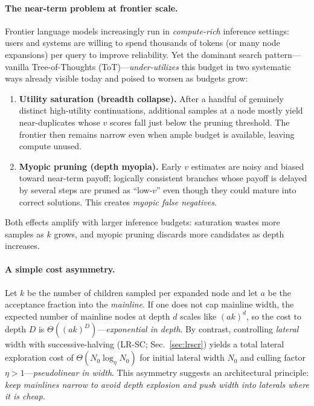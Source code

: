 \documentclass{article}
\begin{document}
\paragraph{The near-term problem at frontier scale.}
Frontier language models increasingly run in \emph{compute-rich} inference settings:
users and systems are willing to spend thousands of tokens (or many node expansions) per query to improve reliability.
Yet the dominant search pattern—vanilla Tree-of-Thoughts (ToT)—\emph{under-utilizes} this budget in two systematic ways already visible today and poised to worsen as budgets grow:
\begin{enumerate}[leftmargin=*, itemsep=2pt, topsep=2pt]
    \item \textbf{Utility saturation (breadth collapse).} After a handful of genuinely distinct high-utility continuations, additional samples at a node mostly yield near-duplicates whose $v$ scores fall just below the pruning threshold. The frontier then remains narrow even when ample budget is available, leaving compute unused.
    \item \textbf{Myopic pruning (depth myopia).} Early $v$ estimates are noisy and biased toward near-term payoff; logically consistent branches whose payoff is delayed by several steps are pruned as ``low-$v$'' even though they could mature into correct solutions. This creates \emph{myopic false negatives}.
\end{enumerate}
Both effects amplify with larger inference budgets: saturation wastes more samples as $k$ grows, and myopic pruning discards more candidates as depth increases.

\paragraph{A simple cost asymmetry.}
Let $k$ be the number of children sampled per expanded node and let $a$ be the acceptance fraction into the \emph{mainline}.
If one does not cap mainline width, the expected number of mainline nodes at depth $d$ scales like $(ak)^d$, so the cost to depth $D$ is $\Theta((ak)^D)$—\emph{exponential in depth}.
By contrast, controlling \emph{lateral} width with successive-halving (LR-SC; Sec.~\ref{sec:lrscr}) yields a total lateral exploration cost of $\Theta(N_0 \log_{\eta} N_0)$ for initial lateral width $N_0$ and culling factor $\eta>1$—\emph{pseudolinear in width}.
This asymmetry suggests an architectural principle:
\emph{keep mainlines narrow to avoid depth explosion and push width into laterals where it is cheap.}
\end{document}
